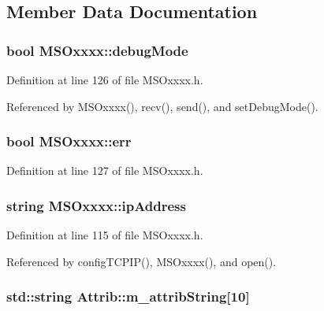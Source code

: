 \subsection{Member Data Documentation}
\hypertarget{classMSOxxxx_a826ba82e93bbe5780169107a31dbfd29}{
\subsubsection[{debugMode}]{\setlength{\rightskip}{0pt plus 5cm}bool {\bf MSOxxxx::debugMode}}}
\label{classMSOxxxx_a826ba82e93bbe5780169107a31dbfd29}


Definition at line 126 of file MSOxxxx.h.

Referenced by MSOxxxx(), recv(), send(), and setDebugMode().\hypertarget{classMSOxxxx_af0af7ac8123ee93917d0e92ec947acaa}{
\subsubsection[{err}]{\setlength{\rightskip}{0pt plus 5cm}bool {\bf MSOxxxx::err}}}
\label{classMSOxxxx_af0af7ac8123ee93917d0e92ec947acaa}


Definition at line 127 of file MSOxxxx.h.\hypertarget{classMSOxxxx_aa55bdb0feb799b195628fe6ef0222b62}{
\subsubsection[{ipAddress}]{\setlength{\rightskip}{0pt plus 5cm}string {\bf MSOxxxx::ipAddress}}}
\label{classMSOxxxx_aa55bdb0feb799b195628fe6ef0222b62}


Definition at line 115 of file MSOxxxx.h.

Referenced by configTCPIP(), MSOxxxx(), and open().\hypertarget{classAttrib_a3414521d7a82476e874b25a5407b5e63}{
\subsubsection[{m\_\-attribString}]{\setlength{\rightskip}{0pt plus 5cm}std::string {\bf Attrib::m\_\-attribString}\mbox{[}10\mbox{]}}}
\label{classAttrib_a3414521d7a82476e874b25a5407b5e63}


